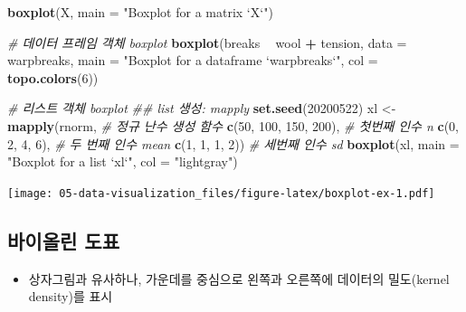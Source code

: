 \documentclass[
  11pt,
]{krantz}
\newenvironment{Shaded}{\begin{snugshade}}{\end{snugshade}}
\newcommand{\CommentTok}[1]{\textcolor[rgb]{0.37,0.37,0.37}{\textit{#1}}}
\newcommand{\DataTypeTok}[1]{\textcolor[rgb]{0.27,0.27,0.27}{#1}}
\newcommand{\DecValTok}[1]{\textcolor[rgb]{0.06,0.06,0.06}{#1}}
\newcommand{\KeywordTok}[1]{\textcolor[rgb]{0.27,0.27,0.27}{\textbf{#1}}}
\newcommand{\NormalTok}[1]{#1}
\newcommand{\OperatorTok}[1]{\textcolor[rgb]{0.43,0.43,0.43}{\textbf{#1}}}
\newcommand{\StringTok}[1]{\textcolor[rgb]{0.5,0.5,0.5}{#1}}
\providecommand{\tightlist}{%
  \setlength{\itemsep}{0pt}\setlength{\parskip}{0pt}}
\begin{document}
\begin{Shaded}
\begin{Highlighting}[]
\KeywordTok{boxplot}\NormalTok{(X, }
        \DataTypeTok{main =} \StringTok{"Boxplot for a matrix `X`"}\NormalTok{)}

\CommentTok{# 데이터 프레임 객체 boxplot}
\KeywordTok{boxplot}\NormalTok{(breaks }\OperatorTok{~}\StringTok{ }\NormalTok{wool }\OperatorTok{+}\StringTok{ }\NormalTok{tension, }
        \DataTypeTok{data =}\NormalTok{ warpbreaks, }
        \DataTypeTok{main =} \StringTok{"Boxplot for a dataframe `warpbreaks`"}\NormalTok{, }
        \DataTypeTok{col =} \KeywordTok{topo.colors}\NormalTok{(}\DecValTok{6}\NormalTok{))}

\CommentTok{# 리스트 객체 boxplot}
\CommentTok{## list 생성: mapply}
\KeywordTok{set.seed}\NormalTok{(}\DecValTok{20200522}\NormalTok{)}
\NormalTok{xl <-}\StringTok{ }\KeywordTok{mapply}\NormalTok{(rnorm, }\CommentTok{# 정규 난수 생성 함수}
             \KeywordTok{c}\NormalTok{(}\DecValTok{50}\NormalTok{, }\DecValTok{100}\NormalTok{, }\DecValTok{150}\NormalTok{, }\DecValTok{200}\NormalTok{), }\CommentTok{# 첫번째 인수 n}
             \KeywordTok{c}\NormalTok{(}\DecValTok{0}\NormalTok{, }\DecValTok{2}\NormalTok{, }\DecValTok{4}\NormalTok{, }\DecValTok{6}\NormalTok{), }\CommentTok{# 두 번째 인수 mean}
             \KeywordTok{c}\NormalTok{(}\DecValTok{1}\NormalTok{, }\DecValTok{1}\NormalTok{, }\DecValTok{1}\NormalTok{, }\DecValTok{2}\NormalTok{)) }\CommentTok{# 세번째 인수 sd}
\KeywordTok{boxplot}\NormalTok{(xl, }
        \DataTypeTok{main =} \StringTok{"Boxplot for a list `xl`"}\NormalTok{, }
        \DataTypeTok{col =} \StringTok{"lightgray"}\NormalTok{)}
\end{Highlighting}
\end{Shaded}

\texttt{[image: 05-data-visualization\_files/figure-latex/boxplot-ex-1.pdf]}

\normalsize

\hypertarget{violin-plot}{%
\subsection{바이올린 도표}\label{violin-plot}}

\begin{itemize}
\tightlist
\item
  상자그림과 유사하나, 가운데를 중심으로 왼쪽과 오른쪽에 데이터의 밀도(kernel density)를 표시
\end{itemize}
\end{document}
